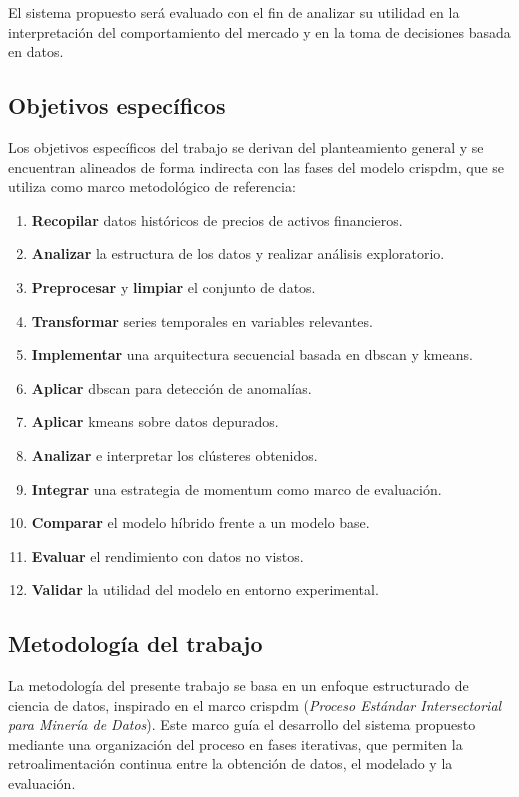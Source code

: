 \documentclass[
]{article}
\begin{document}
El sistema propuesto será evaluado con el fin de analizar su utilidad en
la interpretación del comportamiento del mercado y en la toma de
decisiones basada en datos.

\subsection{Objetivos específicos}

Los objetivos específicos del trabajo se derivan del planteamiento general
y se encuentran alineados de forma indirecta con las fases del modelo
\gls{crispdm}, que se utiliza como marco metodológico de referencia:

\begin{enumerate}
\item \textbf{Recopilar} datos históricos de precios de activos financieros.
\item \textbf{Analizar} la estructura de los datos y realizar análisis exploratorio.
\item \textbf{Preprocesar} y \textbf{limpiar} el conjunto de datos.
\item \textbf{Transformar} series temporales en variables relevantes.
\item \textbf{Implementar} una arquitectura secuencial basada en \gls{dbscan} y \gls{kmeans}.
\item \textbf{Aplicar} \gls{dbscan} para detección de anomalías.
\item \textbf{Aplicar} \gls{kmeans} sobre datos depurados.
\item \textbf{Analizar} e interpretar los clústeres obtenidos.
\item \textbf{Integrar} una estrategia de \gls{momentum} como marco de evaluación.
\item \textbf{Comparar} el modelo híbrido frente a un modelo base.
\item \textbf{Evaluar} el rendimiento con datos no vistos.
\item \textbf{Validar} la utilidad del modelo en entorno experimental.
\end{enumerate}

\subsection{Metodología del trabajo}

La metodología del presente trabajo se basa en un enfoque 
estructurado de ciencia de datos, inspirado en el marco \gls{crispdm} 
(\emph{Proceso Estándar Intersectorial para Minería de Datos}). 
Este marco guía el desarrollo del sistema propuesto mediante una 
organización del proceso en fases iterativas, que permiten la 
retroalimentación continua entre la obtención de datos, el modelado 
y la evaluación.
\end{document}
